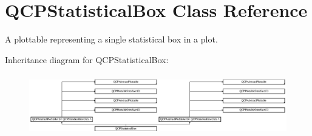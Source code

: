 \hypertarget{class_q_c_p_statistical_box}{}\section{Q\+C\+P\+Statistical\+Box Class Reference}
\label{class_q_c_p_statistical_box}


A plottable representing a single statistical box in a plot.  


Inheritance diagram for Q\+C\+P\+Statistical\+Box\+:\begin{figure}[H]
\begin{center}
\leavevmode
\includegraphics[height=2.718446cm]{class_q_c_p_statistical_box}
\end{center}
\end{figure}
